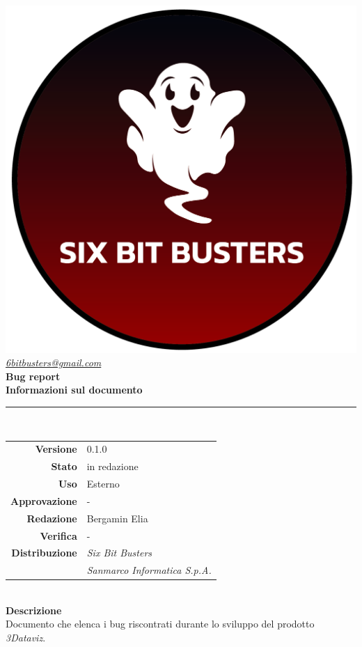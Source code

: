 \thispagestyle{empty}
\renewcommand{\arraystretch}{1.3}


\begin{titlepage}
	\begin{center}
		
	\includegraphics[scale = 0.6]{template/images/logo-circle.png}
	\\[0.8cm]
	\href{mailto:6bitbusters@gmail.com}		      	
	{\large{\textit{6bitbusters@gmail.com} } }\\[0.8cm]
	
	\Huge \textbf{Bug report} \\[0.5cm]

	\large \textbf{Informazioni sul documento} \\
	\rule{0.6\textwidth}{0.4pt}
	\\[0.5cm]
	\begin{tabular}{r|l}
		\textbf{Versione} &0.1.0\\
		\textbf{Stato} & in redazione\\
		\textbf{Uso} & Esterno\\                         
		\textbf{Approvazione} & -\\                      
		\textbf{Redazione} & Bergamin Elia\\
		\textbf{Verifica} & -\\                     
		\textbf{Distribuzione} & \textit{Six Bit Busters} \\ & \textit{Sanmarco Informatica S.p.A.}
	\end{tabular}	
	\\[0.8cm]

	\large \textbf{Descrizione} \\ Documento che elenca i bug riscontrati durante lo sviluppo del prodotto \textit{3Dataviz}.
	
	\end{center}
\end{titlepage}

